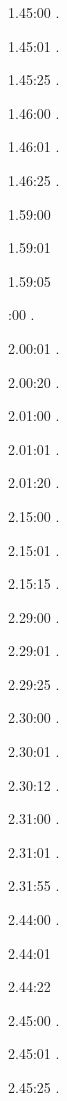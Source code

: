 \label{key}\documentclass[italian]{article}
\begin{document}
1.45:00   .

1.45:01   .

1.45:25   .

1.46:00   .

1.46:01   .

1.46:25   .

1.59:00   

1.59:01   

1.59:05   

:00  .

2.00:01   . 

2.00:20  .

2.01:00   . 

2.01:01  .

2.01:20   . 

2.15:00   . 

2.15:01   . 

2.15:15   . 

2.29:00   . 

2.29:01   . 

2.29:25   . 

2.30:00   .

2.30:01   .

2.30:12   .

2.31:00   .

2.31:01   .

2.31:55   .

2.44:00   .

2.44:01   

2.44:22   

2.45:00   .

2.45:01   .

2.45:25   .
\end{document}
